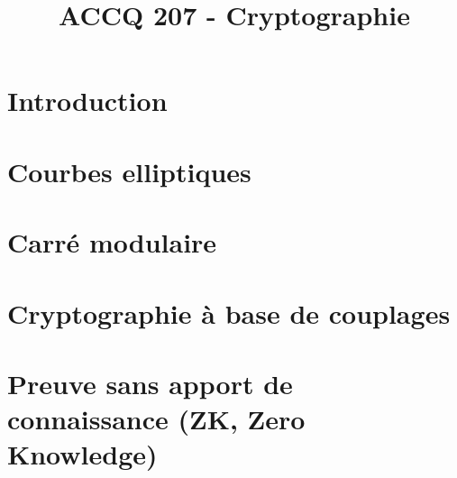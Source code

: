 \documentclass[a4paper,9pt]{article}
\title{\vspace{-1.2cm} \textbf{ACCQ 207 - Cryptographie}}
\begin{document}
\maketitle

\vspace{-1.5cm}

\section{Introduction}
	

\section{Courbes elliptiques}
	

\section{Carré modulaire}
	

\section{Cryptographie à base de couplages}
	

\section{Preuve sans apport de connaissance (ZK, Zero Knowledge)}
	
\end{document}
